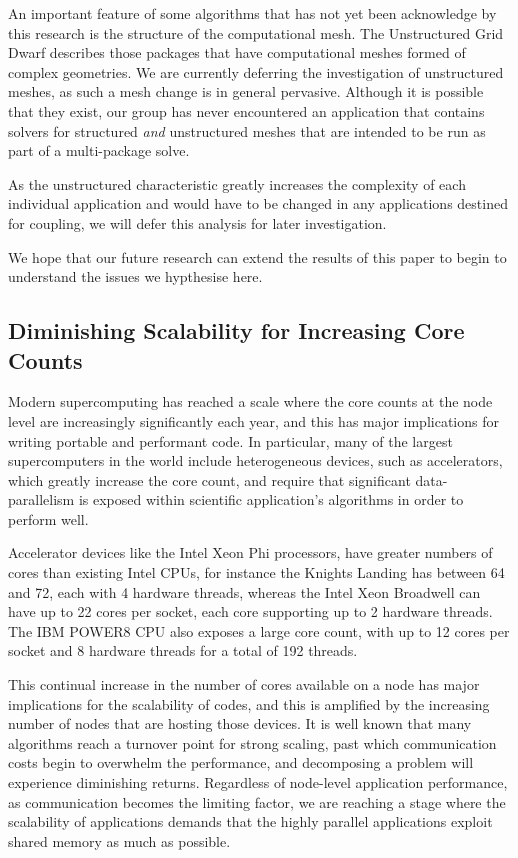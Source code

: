 \documentclass[runningheads,a4paper]{llncs}
\begin{document}
An important feature of some algorithms that has not yet been acknowledge by this research is the structure of the computational mesh. The Unstructured Grid Dwarf describes those packages that have computational meshes formed of complex geometries. We are currently deferring the investigation of unstructured meshes, as such a mesh change is in general pervasive. Although it is possible that they exist, our group has never encountered an application that contains solvers for structured \textit{and} unstructured meshes that are intended to be run as part of a multi-package solve. 

As the unstructured characteristic greatly increases the complexity of each individual application and would have to be changed in any applications destined for coupling, we will defer this analysis for later investigation.

We hope that our future research can extend the results of this paper to begin to understand the issues we hypthesise here.

\subsection{Diminishing Scalability for Increasing Core Counts}

\label{sec:scalability-inhibit}

Modern supercomputing has reached a scale where the core counts at the node level are increasingly significantly each year, and this has major implications for writing portable and performant code. In particular, many of the largest supercomputers in the world include heterogeneous devices, such as accelerators, which greatly increase the core count, and require that significant data-parallelism is exposed within scientific application's algorithms in order to perform well.

Accelerator devices like the Intel Xeon Phi processors, have greater numbers of cores than existing Intel CPUs, for instance the Knights Landing has between 64 and 72, each with 4 hardware threads, whereas the Intel Xeon Broadwell can have up to 22 cores per socket, each core supporting up to 2 hardware threads. The IBM POWER8 CPU also exposes a large core count, with up to 12 cores per socket and 8 hardware threads for a total of 192 threads.

This continual increase in the number of cores available on a node has major implications for the scalability of codes, and this is amplified by the increasing number of nodes that are hosting those devices. It is well known that many algorithms reach a turnover point for strong scaling, past which communication costs begin to overwhelm the performance, and decomposing a problem will experience diminishing returns. Regardless of node-level application performance, as communication becomes the limiting factor, we are reaching a stage where the scalability of applications demands that the highly parallel applications exploit shared memory as much as possible.
\end{document}
